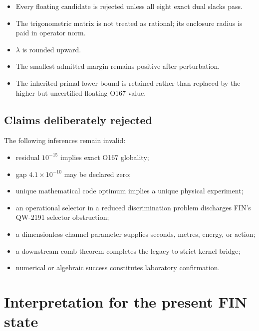 \documentclass[11pt,a4paper,openany]{report}
\begin{document}
\begin{itemize}
\item 
Every floating candidate is rejected unless all eight exact dual slacks pass.

\item 
The trigonometric matrix is not treated as rational; its enclosure radius is paid in operator norm.

\item 
\(\lambda\) is rounded upward.

\item 
The smallest admitted margin remains positive after perturbation.

\item 
The inherited primal lower bound is retained rather than replaced by the higher but uncertified floating O167 value.

\end{itemize}

\section{Claims deliberately rejected}

The following inferences remain invalid:

\begin{itemize}
\item 
residual \(10^{-15}\) implies exact O167 globality;

\item 
gap \(4.1\times10^{-10}\) may be declared zero;

\item 
unique mathematical code optimum implies a unique physical experiment;

\item 
an operational selector in a reduced discrimination problem discharges FIN's QW-2191 selector obstruction;

\item 
a dimensionless channel parameter supplies seconds, metres, energy, or action;

\item 
a downstream comb theorem completes the legacy-to-strict kernel bridge;

\item 
numerical or algebraic success constitutes laboratory confirmation.

\end{itemize}

\chapter{Interpretation for the present FIN state}
\end{document}
